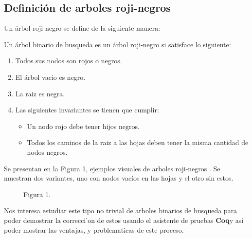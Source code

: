 \documentclass[letterpaper,12pt,oneside]{book}
\newcommand{\coq}{\textbf{Coq}}
\newcommand{\arn}{árbol roji-negro }
\newcommand{\arns}{arboles roji-negros }
\begin{document}
\subsection{Definici\'on de \arns}
Un \arn se define de la siguiente manera:
{
Un \'arbol binario de busqueda es un \arn si satisface lo siguiente:
\begin{enumerate}
    \item Todos sus nodos son rojos o negros.
    \item El \'arbol vacio es negro.
    \item La raiz es negra.
    \item Las siguientes invariantes se tienen que cumplir:
    \begin{itemize}
        \item Un nodo rojo debe tener hijos negros.
        \item Todos los caminos de la raiz a las hojas deben tener la misma cantidad de nodos negros.
    \end{itemize}
\end{enumerate}
}
Se presentan en la Figura 1, ejemplos visuales de \arns. Se muestran dos variantes, uno con nodos vacíos en las hojas
y el otro sin estos.

\hspace*{5cm}
\begin{figure}
\label{arbolRB}
\centering Figura 1.
\end{figure}
Nos interesa estudiar este tipo no trivial de arboles binarios de busqueda para poder
demostrar la correcci'on de estos usando el asistente de pruebas \coq y asi poder mostrar las ventajas, 
y problematicas de este proceso.
\end{document}
